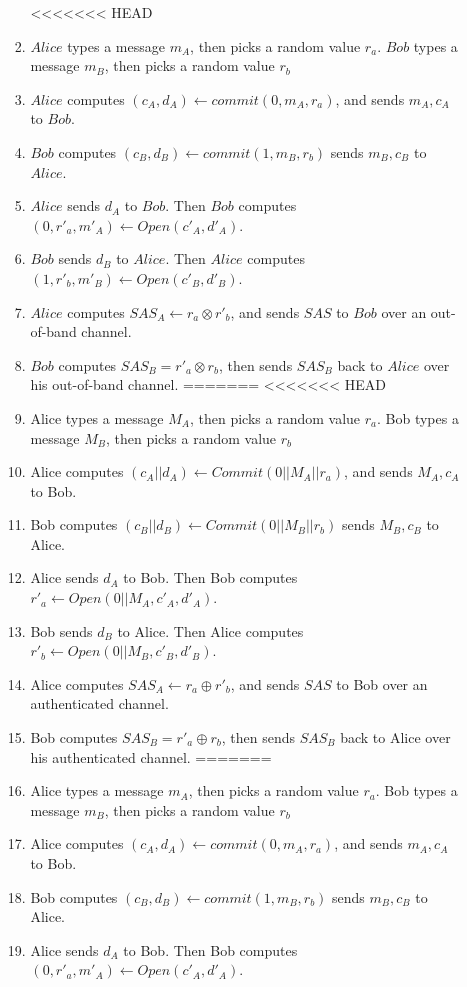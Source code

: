 \begin{enumerate}
\begin{enumerate}
\begin{enumerate}
<<<<<<< HEAD
\item $Alice$ types a message $m_A$, then picks a random value $r_a$. $Bob$ types a message $m_B$, then picks a random value $r_b$
\item $Alice$ computes $(c_A,d_A) \leftarrow commit(0,m_A,r_a)$, and sends $m_A, c_A$ to $Bob$.
\item $Bob$ computes $(c_B,d_B) \leftarrow commit(1,m_B,r_b)$ sends $m_B, c_B$ to $Alice$.
\item $Alice$ sends $d_A$ to $Bob$. Then $Bob$ computes $(0,r'_a,m'_A) \leftarrow Open(c'_A,d'_A)$. 
\item $Bob$ sends $d_B$ to $Alice$. Then $Alice$ computes $(1,r'_b,m'_B) \leftarrow Open(c'_B,d'_B)$. 
\item $Alice$ computes $SAS_A \leftarrow r_a \otimes r'_b$, and sends $SAS$ to $Bob$ over an out-of-band channel. 
\item $Bob$ computes $SAS_B = r'_a \otimes r_b$, then sends $SAS_B$ back to $Alice$ over his out-of-band channel. 
=======
<<<<<<< HEAD
\item Alice types a message $M_A$, then picks a random value $r_a$. Bob types a message $M_B$, then picks a random value $r_b$
\item Alice computes $(c_A||d_A) \leftarrow Commit(0||M_A||r_a)$, and sends $M_A, c_A$ to Bob.
\item Bob computes $(c_B||d_B) \leftarrow Commit(0||M_B||r_b)$ sends $M_B, c_B$ to Alice.
\item Alice sends $d_A$ to Bob. Then Bob computes $r'_a \leftarrow Open(0||M_A,c'_A,d'_A)$. 
\item Bob sends $d_B$ to Alice. Then Alice computes $r'_b \leftarrow Open(0||M_B,c'_B,d'_B)$. 
\item Alice computes $SAS_A \leftarrow r_a \oplus r'_b$, and sends $SAS$ to Bob over an authenticated channel. 
\item Bob computes $SAS_B = r'_a \oplus r_b$, then sends $SAS_B$ back to Alice over his authenticated channel. 
=======
\item Alice types a message $m_A$, then picks a random value $r_a$. Bob types a message $m_B$, then picks a random value $r_b$
\item Alice computes $(c_A,d_A) \leftarrow commit(0,m_A,r_a)$, and sends $m_A, c_A$ to Bob.
\item Bob computes $(c_B,d_B) \leftarrow commit(1,m_B,r_b)$ sends $m_B, c_B$ to Alice.
\item Alice sends $d_A$ to Bob. Then Bob computes $(0,r'_a,m'_A) \leftarrow Open(c'_A,d'_A)$. 

\end{enumerate}
\end{enumerate}
\end{enumerate}
